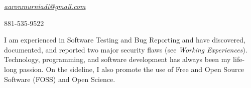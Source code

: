 \documentclass[11pt,a4paper]{article} %
\begin{document}


\noindent\bull\href{mailto:aaronmurniadi@gmail.com}{\textit{aaronmurniadi@gmail.com}}

\noindent\bull{} 881-535-9522 %




\vspace{-1.3em} %

\begin{multicols}{2}  %
    \noindent I am experienced in Software Testing and Bug Reporting and have discovered, documented, and reported two
    major security flaws (see \textit{Working Experiences}). Technology, programming, and software development has always been my life-long passion.
    On the sideline, I also promote the use of Free and Open Source Software (FOSS) and Open Science.

\end{multicols}



\end{document}
